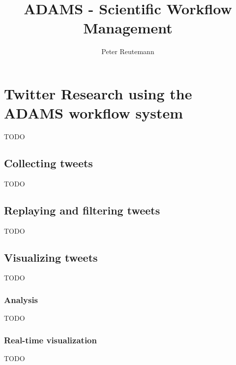 \documentclass[a4paper,10pt]{book}
\title{ADAMS - Scientific Workflow Management}
\author{Peter Reutemann}
\begin{document}
\chapter{Twitter Research using the ADAMS workflow system}
TODO

\section{Collecting tweets}
TODO

\section{Replaying and filtering tweets}
TODO

\section{Visualizing tweets}
TODO

\subsection{Analysis}
TODO

\subsection{Real-time visualization}
TODO
\end{document}
